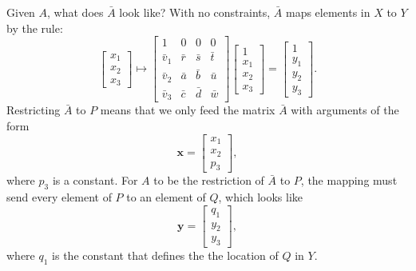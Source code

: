 \documentclass[11pt]{article}
\begin{document}
Given $A$, what does $\bar{A}$ look like?  With no constraints,
$\bar{A}$ maps elements in $X$ to $Y$ by the rule:
\begin{equation}
  \left[ 
    \begin{matrix}
      x_1\\x_2\\x_3
    \end{matrix}
  \right] \longmapsto
  \left[
    \begin{matrix}
           1     & 0 & 0 & 0 \\
      \bar{v}_1  & \bar{r} & \bar{s} & \bar{t} \\
      \bar{v}_2  & \bar{a} & \bar{b} & \bar{u} \\
      \bar{v}_3  & \bar{c} & \bar{d} & \bar{w} 
    \end{matrix}
  \right]
  \left[
    \begin{matrix}
      1\\x_1\\x_2\\x_3
    \end{matrix}
  \right] = 
  \left[
    \begin{matrix}
      1\\y_1\\y_2\\y_3
    \end{matrix}
  \right].
\end{equation}
Restricting $\bar{A}$ to $P$ means that we only feed the matrix
$\bar{A}$ with arguments of the form
\begin{equation}
  \mathbf{x} = \left[
    \begin{matrix}
      x_1\\x_2\\p_3
    \end{matrix}
  \right],
\end{equation}
where $p_3$ is a constant.
For $A$ to be the restriction of $\bar{A}$ to $P$, the mapping must
send every element of $P$ to an element of $Q$, which looks like
\begin{equation}
  \mathbf{y} = \left[
    \begin{matrix}
      q_1\\y_2\\y_3
    \end{matrix}
  \right],
\end{equation}
where $q_1$ is the constant that defines the the location of $Q$ in $Y$.
\end{document}
